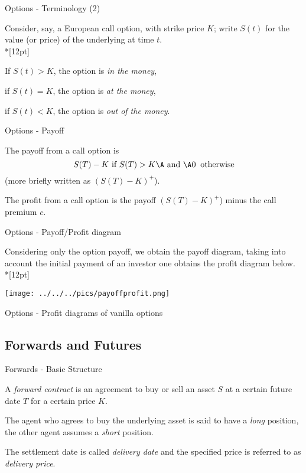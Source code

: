 {Options - Terminology (2)}

Consider, say, a European call option, with strike price $K$;
write $S(t)$ for the value (or price) of the underlying at time
$t$.\\*[12pt]
  \item<1-> If $S(t) > K$, the option is {\it in the money},
  \item<2-> if $S(t) = K$, the option is {\it at the money},
  \item<3-> if $S(t) < K$, the option is {\it out of the money}.

{Options - Payoff}

  \item<1-> The payoff from a call option is $$ S(T) - K \mbox{ if } S(T)
> K\A \mbox{ and }\A 0 \;\; \mbox{otherwise} $$ (more briefly
written as  $(S(T) - K)^+$).
\item<2-> The profit from a call option is the payoff $(S(T) - K)^+$) minus the call premium $c$.

{Options - Payoff/Profit diagram }

Considering only the option payoff, we obtain the payoff diagram, taking into account the initial payment of an investor one obtains the profit diagram below.\\*[12pt]

\begin{center}
\texttt{[image: ../../../pics/payoffprofit.png]}
\end{center}

{Options - Profit diagrams of vanilla options}
\begin{figure}
  \centering
   \qquad
\end{figure}

\subsection{Forwards and Futures}

{Forwards - Basic Structure}

\item<1->
A {\it forward contract}
is an agreement to buy or sell an asset $S$ at a certain future
date $T$ for a certain price $K$.
\item<2->
The agent who agrees to
buy the underlying asset is said to have a {\it long} position,
the other agent assumes a {\it short} position.
\item<3-> The settlement
date is called {\it delivery date} and the specified price is
referred to as {\it delivery price}.

